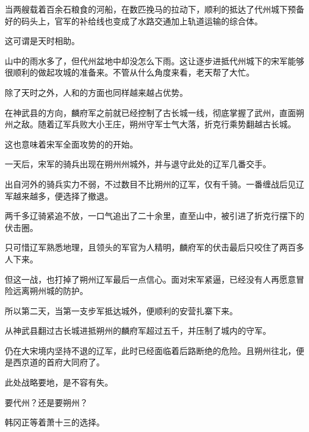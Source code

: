 当两艘载着百余石粮食的河船，在数匹挽马的拉动下，顺利的抵达了代州城下预备好的码头上，官军的补给线也变成了水路交通加上轨道运输的综合体。

这可谓是天时相助。

山中的雨水多了，但代州盆地中却没怎么下雨。这让逐步进抵代州城下的宋军能够很顺利的做起攻城的准备来。不管从什么角度来看，老天帮了大忙。

除了天时之外，人和的方面也同样越来越占优势。

在神武县的方向，麟府军之前就已经控制了古长城一线，彻底掌握了武州，直面朔州之敌。随着辽军兵败大小王庄，朔州守军士气大落，折克行乘势翻越古长城。

这也意味着宋军全面攻势的的开始。

一天后，宋军的骑兵出现在朔州州城外，并与退守此处的辽军几番交手。

出自河外的骑兵实力不弱，不过数目不比朔州的辽军，仅有千骑。一番缠战后见辽军越来越多，便选择了撤退。

两千多辽骑紧追不放，一口气追出了二十余里，直至山中，被引进了折克行摆下的伏击圈。

只可惜辽军熟悉地理，且领头的军官为人精明，麟府军的伏击最后只咬住了两百多人下来。

但这一战，也打掉了朔州辽军最后一点信心。面对宋军紧逼，已经没有人再愿意冒险远离朔州城的防护。

所以第二天，当第一支步军抵达城外，便顺利的安营扎寨下来。

从神武县翻过古长城进抵朔州的麟府军超过五千，并压制了城内的守军。

仍在大宋境内坚持不退的辽军，此时已经面临着后路断绝的危险。且朔州往北，便是西京道的首府大同府了。

此处战略要地，是不容有失。

要代州？还是要朔州？

韩冈正等着萧十三的选择。

